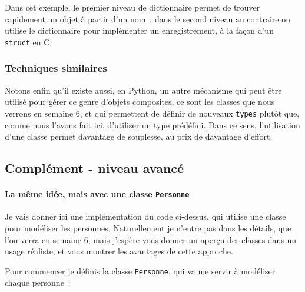     Dans cet exemple, le premier niveau de dictionnaire permet de trouver
rapidement un objet à partir d'un nom~; dans le second niveau au
contraire on utilise le dictionnaire pour implémenter un enregistrement,
à la façon d'un \texttt{struct} en C.

    \hypertarget{techniques-similaires}{%
\subsubsection{Techniques similaires}\label{techniques-similaires}}

    Notons enfin qu'il existe aussi, en Python, un autre mécanisme qui peut
être utilisé pour gérer ce genre d'objets composites, ce sont les
classes que nous verrons en semaine 6, et qui permettent de définir de
nouveaux \texttt{types} plutôt que, comme nous l'avons fait ici,
d'utiliser un type prédéfini. Dans ce sens, l'utilisation d'une classe
permet davantage de souplesse, au prix de davantage d'effort.

    \hypertarget{compluxe9ment---niveau-avancuxe9}{%
\subsection{Complément - niveau
avancé}\label{compluxe9ment---niveau-avancuxe9}}

    \hypertarget{la-muxeame-iduxe9e-mais-avec-une-classe-personne}{%
\paragraph{\texorpdfstring{La même idée, mais avec une classe
\texttt{Personne}}{La même idée, mais avec une classe Personne}}\label{la-muxeame-iduxe9e-mais-avec-une-classe-personne}}

    Je vais donner ici une implémentation du code ci-dessus, qui utilise une
classe pour modéliser les personnes. Naturellement je n'entre pas dans
les détails, que l'on verra en semaine 6, mais j'espère vous donner un
aperçu des classes dans un usage réaliste, et vous montrer les avantages
de cette approche.

    Pour commencer je définis la classe \texttt{Personne}, qui va me servir
à modéliser chaque personne~:

